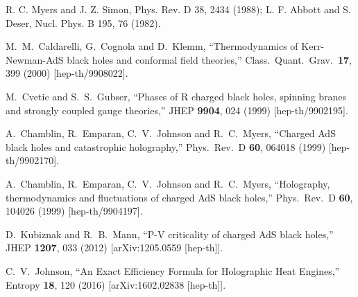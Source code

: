 \documentclass[preprint,showpacs,showkeys,onecolumn,nofootinbib]{revtex4}
\begin{document}
\begin{thebibliography}{99}
R. C. Myers and J. Z. Simon, Phys. Rev. D 38, 2434 (1988);
L. F. Abbott and S. Deser, Nucl. Phys. B 195, 76 (1982).

  M.~M.~Caldarelli, G.~Cognola and D.~Klemm,
  ``Thermodynamics of Kerr-Newman-AdS black holes and conformal field theories,''
  Class.\ Quant.\ Grav.\  {\bf 17}, 399 (2000)
  [hep-th/9908022].

  M.~Cvetic and S.~S.~Gubser,
  ``Phases of R charged black holes, spinning branes and strongly coupled gauge theories,''
  JHEP {\bf 9904}, 024 (1999)
  [hep-th/9902195].


  A.~Chamblin, R.~Emparan, C.~V.~Johnson and R.~C.~Myers,
  ``Charged AdS black holes and catastrophic holography,''
  Phys.\ Rev.\ D {\bf 60}, 064018 (1999)
  [hep-th/9902170].


  A.~Chamblin, R.~Emparan, C.~V.~Johnson and R.~C.~Myers,
  ``Holography, thermodynamics and fluctuations of charged AdS black holes,''
  Phys.\ Rev.\ D {\bf 60}, 104026 (1999)
  [hep-th/9904197].


  D.~Kubiznak and R.~B.~Mann,
  ``P-V criticality of charged AdS black holes,''
  JHEP {\bf 1207}, 033 (2012)
  [arXiv:1205.0559 [hep-th]].


  C.~V.~Johnson,
  ``An Exact Efficiency Formula for Holographic Heat Engines,''
  Entropy {\bf 18}, 120 (2016)
  [arXiv:1602.02838 [hep-th]].


\end{thebibliography}
\end{document}
